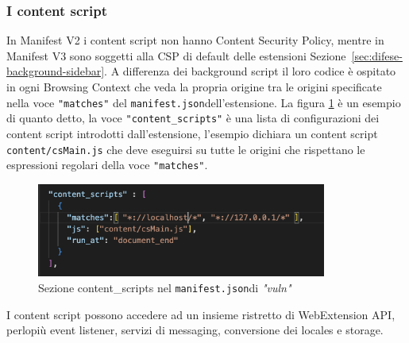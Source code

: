 \documentclass{sapthesis}
\newcommand{\code}[1]{\texttt{#1}}
\newcommand{\file}[1]{\code{#1}}
\newcommand{\refSection}[1]{Sezione~\ref{#1}}
\newcommand{\vuln}{\textit{"vuln"}}
\newcommand{\manifest}{\code{manifest.json}}
\begin{document}
            \subsubsection{I content script}
            \label{sec:difese-content-script}
                In Manifest V2 i content script non hanno Content Security Policy, mentre in Manifest V3 sono soggetti
                alla CSP di default delle estensioni \refSection{sec:difese-background-sidebar}.
                A differenza dei background script il loro codice è ospitato in ogni Browsing Context 
                che veda la propria origine tra le origini specificate nella voce \code{"matches"} del \manifest dell'estensione.
                La figura \ref{fig:vuln-manifest-contentscript} è un esempio di quanto detto,
                la voce \code{"content\_scripts"} è una lista di configurazioni dei content script introdotti dall'estensione,
                l'esempio dichiara un content script \file{content/csMain.js} che deve eseguirsi su tutte le
                origini che rispettano le espressioni regolari della voce \code{"matches"}.
    
                \begin{figure}[ht]
                    \centering
                    \includegraphics[width=0.85\textwidth]{vuln-manifest-content-script.png}
                    \caption{Sezione content\_scripts nel \manifest di \vuln}
                    \label{fig:vuln-manifest-contentscript}
                \end{figure}
    
                I content script possono accedere ad un insieme ristretto di WebExtension API, perlopiù event listener,
                servizi di messaging, conversione dei locales e storage.
    
\end{document}
